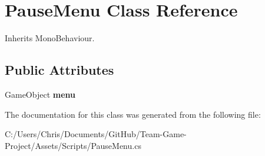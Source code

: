 \hypertarget{class_pause_menu}{}\section{Pause\+Menu Class Reference}
\label{class_pause_menu}


Inherits Mono\+Behaviour.

\subsection*{Public Attributes}
\begin{DoxyCompactItemize}
\item 
Game\+Object {\bfseries menu}\hypertarget{class_pause_menu_a82090cb093db2dcb357e32658a47bf1c}{}\label{class_pause_menu_a82090cb093db2dcb357e32658a47bf1c}

\end{DoxyCompactItemize}


The documentation for this class was generated from the following file\+:\begin{DoxyCompactItemize}
\item 
C\+:/\+Users/\+Chris/\+Documents/\+Git\+Hub/\+Team-\/\+Game-\/\+Project/\+Assets/\+Scripts/Pause\+Menu.\+cs\end{DoxyCompactItemize}
